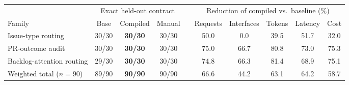 \begin{tabular}{@{}lccccccccc@{}}
\toprule
& \multicolumn{3}{c}{Exact held-out contract} & & \multicolumn{5}{c}{Reduction of compiled vs.\ baseline (\%)} \\
\cmidrule(lr){2-4}\cmidrule(lr){6-10}
Family & Base & Compiled & Manual & & Requests & Interfaces & Tokens & Latency & Cost \\
\midrule
Issue-type routing        & 30/30 & \textbf{30/30} & 30/30 & & 50.0 &  0.0 & 39.5 & 51.7 & 32.0 \\
PR-outcome audit          & 30/30 & \textbf{30/30} & 30/30 & & 75.0 & 66.7 & 80.8 & 73.0 & 75.3 \\
Backlog-attention routing & 29/30 & \textbf{30/30} & 30/30 & & 74.8 & 66.3 & 81.4 & 68.9 & 75.1 \\
\midrule
Weighted total ($n=90$)   & 89/90 & \textbf{90/90} & 90/90 & & 66.6 & 44.2 & 63.1 & 64.2 & 58.7 \\
\bottomrule
\end{tabular}
